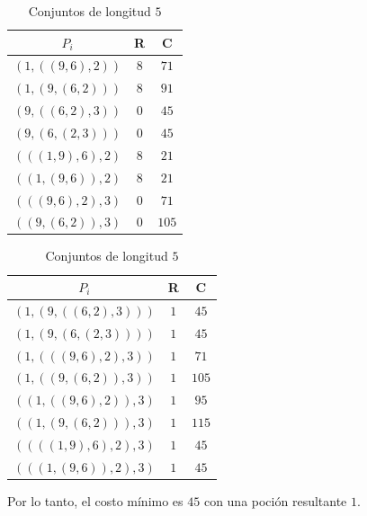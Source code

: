 \documentclass[letterpaper,11pt]{article}
\begin{document}
\begin{enumerate}
\begin{enumerate}
        \begin{table}[H]
            \parbox{.45\linewidth}{
            \centering
            \begin{tabular}{|c|c|c|}
            \hline
            $P_i$ & R & C \\
            \hline
            $(1, ((9,6),2))$ & $8$ & $71$ \\
            \hline
            $(1, (9,(6,2)))$ & $8$ & $91$ \\
            \hline
            $(9, ((6,2),3))$ & $0$ & $45$ \\
            \hline
            $(9, (6,(2,3)))$ & $0$ & $45$ \\
            \hline
            $(((1,9),6), 2)$ & $8$ & $21$ \\
            \hline
            $((1, (9,6)), 2)$ & $8$ & $21$ \\
            \hline
            $(((9,6),2), 3)$ & $0$ & $71$ \\
            \hline
            $((9, (6,2)), 3)$ & $0$ & $105$ \\
            \hline
            \end{tabular}
            \caption{Conjuntos de longitud $4$}
            }
            \hfill
            \parbox{.45\linewidth}{
            \centering
            \begin{tabular}{|c|c|c|}
            \hline
            $P_i$ & R & C\\
            \hline
            $(1, (9, ((6,2),3)))$ & $1$ & $45$\\
            \hline
            $(1, (9, (6,(2,3))))$ & $1$ & $45$\\
            \hline
            $(1, (((9,6),2), 3))$ & $1$ & $71$ \\
            \hline
            $(1, ((9, (6,2)), 3))$ & $1$ & $105$ \\
            \hline
            $((1, ((9,6),2)),3)$ & $1$ & $95$ \\
            \hline
            $((1, (9,(6,2))), 3)$ & $1$ & $115$ \\
            \hline
            $((((1,9),6), 2), 3)$ & $1$ & $45$ \\
            \hline
            $(((1, (9,6)), 2), 3)$ & $1$ & $45$ \\
            \hline
            \end{tabular}
            \caption{Conjuntos de longitud $5$}
            }
            \end{table}

            Por lo tanto, el costo mínimo es $45$ con una poción resultante $1$.
    \end{enumerate}
\end{enumerate}
\end{document}
